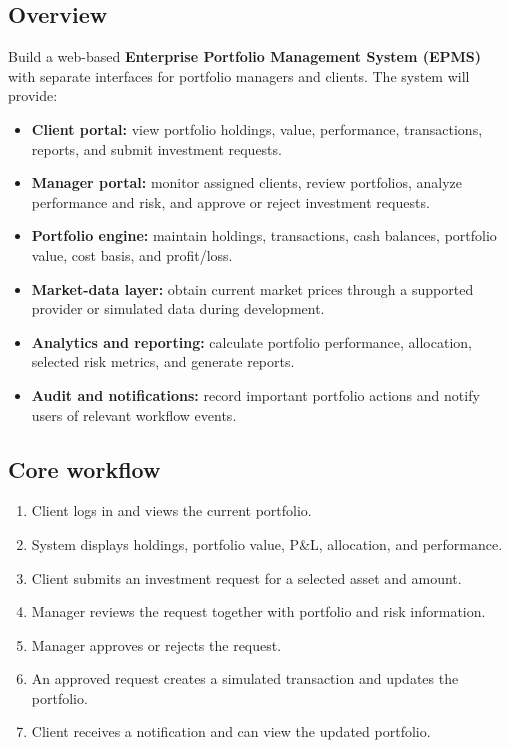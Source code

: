 \documentclass[11pt,a4paper]{article}
\begin{document}
\subsection{Overview}
Build a web-based \textbf{Enterprise Portfolio Management System (EPMS)} with separate interfaces for portfolio managers and clients. The system will provide:
\begin{itemize}[leftmargin=0.7cm]
\item \textbf{Client portal:} view portfolio holdings, value, performance, transactions, reports, and submit investment requests.
\item \textbf{Manager portal:} monitor assigned clients, review portfolios, analyze performance and risk, and approve or reject investment requests.
\item \textbf{Portfolio engine:} maintain holdings, transactions, cash balances, portfolio value, cost basis, and profit/loss.
\item \textbf{Market-data layer:} obtain current market prices through a supported provider or simulated data during development.
\item \textbf{Analytics and reporting:} calculate portfolio performance, allocation, selected risk metrics, and generate reports.
\item \textbf{Audit and notifications:} record important portfolio actions and notify users of relevant workflow events.
\end{itemize}

\subsection{Core workflow}
\begin{enumerate}[leftmargin=0.7cm]
\item Client logs in and views the current portfolio.
\item System displays holdings, portfolio value, P\&L, allocation, and performance.
\item Client submits an investment request for a selected asset and amount.
\item Manager reviews the request together with portfolio and risk information.
\item Manager approves or rejects the request.
\item An approved request creates a simulated transaction and updates the portfolio.
\item Client receives a notification and can view the updated portfolio.
\end{enumerate}
\end{document}
